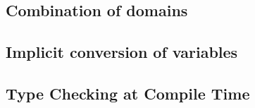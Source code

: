 \subsection{Combination of domains}

\subsection{Implicit conversion of variables}

\subsection{Type Checking at Compile Time}
